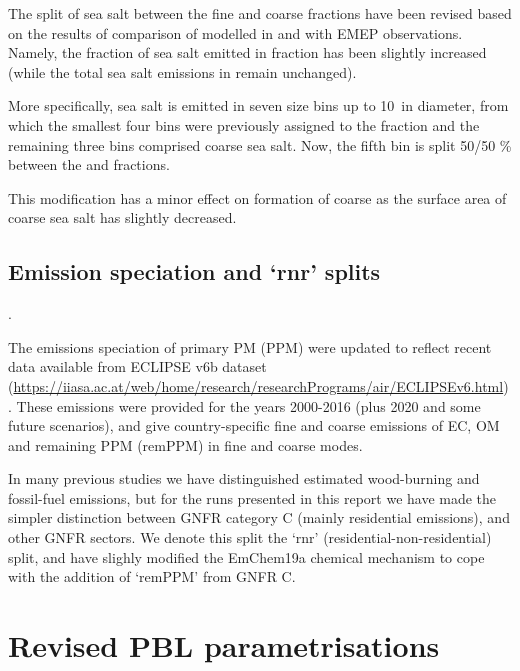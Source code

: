 The split of sea salt between the fine and coarse fractions have been revised based on the results of comparison of modelled  in \PM[2.5] and \PM[10] with EMEP observations. Namely, the fraction of sea salt emitted in \PM[2.5] fraction has been slightly increased (while the total sea salt emissions in \PM[10] remain unchanged). 

More specifically, sea salt is emitted in seven size bins up to 10~\um in diameter, from which the smallest four bins were previously assigned to the \PM[2.5] fraction and the remaining three bins comprised coarse sea salt. Now, the fifth bin is split 50/50 \% between the \PM[2.5] and \PM[2.5-10] fractions.  


This modification has a minor effect on formation of coarse  as the surface area of coarse sea salt has slightly decreased.



\subsection{Emission speciation and `rnr' splits}
\label{ssec:emissplits}.

The emissions speciation of primary PM (PPM) were updated
to reflect recent data available from
ECLIPSE v6b dataset
(\url{https://iiasa.ac.at/web/home/research/researchPrograms/air/ECLIPSEv6.html}).
These emissions were provided for the years 2000-2016 (plus 2020 and some future
scenarios), and give country-specific fine and coarse emissions of EC, OM and remaining
PPM (remPPM) in fine and coarse modes.

In many previous studies we have distinguished estimated wood-burning and
fossil-fuel emissions, but for the runs presented in this report we
have made the simpler distinction between GNFR category C (mainly
residential emissions), and other GNFR sectors.  We denote this
split the `rnr' (residential-non-residential) split, and have slighly
modified the EmChem19a chemical mechanism to cope with the addition
of `remPPM' from GNFR C.


\section{Revised PBL parametrisations}
\label{sec:updateKz}

